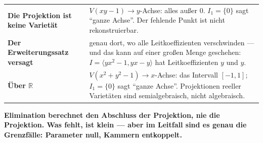 \begin{warnung}
\begin{center}
{\small
\renewcommand{\arraystretch}{1.5}
\begin{tabular}{@{}P{3.2cm}P{5.6cm}@{}}
\toprule
\textbf{Die Projektion ist keine Varietät} & $V(xy - 1)\to y$-Achse: alles außer $0$. $I_1 = \{0\}$ sagt \enquote{ganze Achse}. Der fehlende Punkt ist nicht rekonstruierbar.\\
\textbf{Der Erweiterungssatz versagt} & genau dort, wo alle Leitkoeffizienten verschwinden --- und das kann auf einer großen Menge geschehen: $I = \langle yx^{2} - 1, yx - y\rangle$ hat Leitkoeffizienten $y$ und $y$.\\
\textbf{Über $\mathbb R$} & $V(x^{2} + y^{2} - 1)\to x$-Achse: das Intervall $[-1, 1]$; $I_1 = \{0\}$ sagt \enquote{ganze Achse}. Projektionen reeller Varietäten sind semialgebraisch, nicht algebraisch.\\
\bottomrule
\end{tabular}}
\end{center}

\begin{center}
\begin{minipage}{0.9\textwidth}
\textbf{Elimination berechnet den Abschluss der Projektion, nie die Projektion. Was fehlt, ist klein --- aber im Leitfall sind es genau die Grenzfälle: Parameter null, Kammern entkoppelt.}
\end{minipage}
\end{center}

\begin{center}
\begin{minipage}{0.88\textwidth}
\end{minipage}
\end{center}
\end{warnung}

